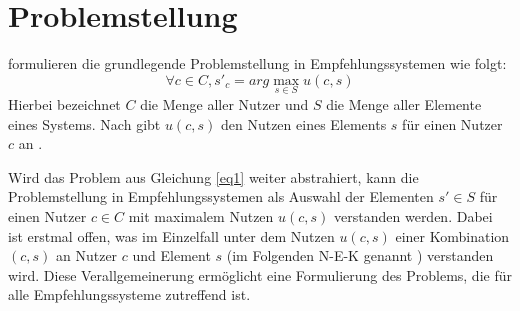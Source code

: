 \section{Problemstellung}
\label{ch:empfehlungssysteme:problemstellung}
\textcite[S. 735]{adomavicius:inproceedings} formulieren die grundlegende Problemstellung in Empfehlungssystemen wie folgt:
\begin{equation}\label{eq1}
    \forall c \in C, s'_c = arg\max_{s \in S} u(c,s)
\end{equation}
Hierbei bezeichnet $C$ die Menge aller Nutzer und $S$ die Menge aller Elemente eines Systems.
Nach \textcite[S. 735]{adomavicius:inproceedings} gibt $u(c,s)$ den Nutzen eines Elements $s$ für einen Nutzer $c$ an \cite[S. 734f.]{adomavicius:inproceedings}.

Wird das Problem aus Gleichung \ref{eq1} weiter abstrahiert, kann die Problemstellung in Empfehlungssystemen als Auswahl der Elementen $s' \in S$ für einen Nutzer $c \in C$ mit maximalem Nutzen $u(c,s)$ verstanden werden.
Dabei ist erstmal offen, was im Einzelfall unter dem Nutzen $u(c,s)$ einer Kombination $(c,s)$ an Nutzer $c$ und Element $s$ (im Folgenden \ac{N-E-K} genannt \cite[S. 3]{recommenderSystems:2016}) verstanden wird.
Diese Verallgemeinerung ermöglicht eine Formulierung des Problems, die für alle Empfehlungssysteme zutreffend ist.

